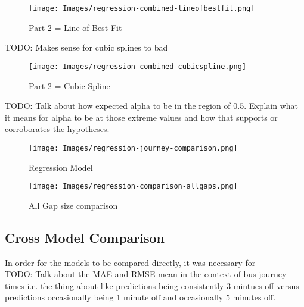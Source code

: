 \begin{figure}[H]
\begin{center}
    \texttt{[image: Images/regression-combined-lineofbestfit.png]}
    \caption{Part 2 = Line of Best Fit}
    \label{fig:regression-part2lineofbestfit}
\end{center}
\end{figure}

TODO: Makes sense for cubic splines to bad 

\begin{figure}[H]
\begin{center}
    \texttt{[image: Images/regression-combined-cubicspline.png]}
    \caption{Part 2 = Cubic Spline}
    \label{fig:regression-part2cubicspline}
\end{center}
\end{figure}

TODO: Talk about how expected alpha to be in the region of 0.5. Explain what it means for alpha to be at those extreme values and how that supports or corroborates the hypotheses.

\begin{figure}[H]
\begin{center}
    \texttt{[image: Images/regression-journey-comparison.png]}
    \caption{Regression Model}
    \label{fig:regression-gap5-journey-comparison}
\end{center}
\end{figure}

\begin{figure}[H]
\begin{center}
    \texttt{[image: Images/regression-comparison-allgaps.png]}
    \caption{All Gap size comparison}
    \label{fig:regression-comparison-allgaps}
\end{center}
\end{figure}

\subsection{Cross Model Comparison}

In order for the models to be compared directly, it was necessary for \\

TODO: Talk about the MAE and RMSE mean in the context of bus journey times i.e. the thing about like predictions being consistently 3 mintues off versus predictions occasionally being 1 minute off and occasionally 5 minutes off.


